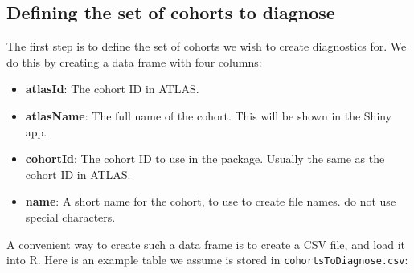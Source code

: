 \documentclass[
]{article}
\providecommand{\tightlist}{%
  \setlength{\itemsep}{0pt}\setlength{\parskip}{0pt}}
\begin{document}
\hypertarget{defining-the-set-of-cohorts-to-diagnose}{%
\subsection{Defining the set of cohorts to
diagnose}\label{defining-the-set-of-cohorts-to-diagnose}}

The first step is to define the set of cohorts we wish to create
diagnostics for. We do this by creating a data frame with four columns:

\begin{itemize}
\tightlist
\item
  \textbf{atlasId}: The cohort ID in ATLAS.
\item
  \textbf{atlasName}: The full name of the cohort. This will be shown in
  the Shiny app.
\item
  \textbf{cohortId}: The cohort ID to use in the package. Usually the
  same as the cohort ID in ATLAS.
\item
  \textbf{name}: A short name for the cohort, to use to create file
  names. do not use special characters.
\end{itemize}

A convenient way to create such a data frame is to create a CSV file,
and load it into R. Here is an example table we assume is stored in
\texttt{cohortsToDiagnose.csv}:
\end{document}
